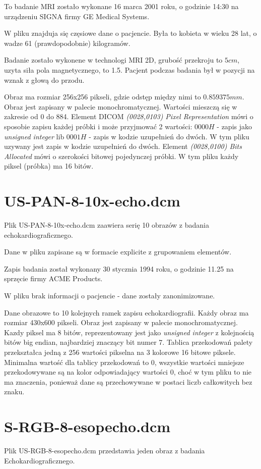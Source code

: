 \documentclass[11pt,a4paper]{article}
\begin{document}
To badanie MRI zostało wykonane 16 marca 2001 roku, o godzinie 14:30 na
urządzeniu SIGNA firmy GE Medical Systems.

W pliku znajduja się częsiowe dane o pacjencie. Była to kobieta w wieku 28 lat,
o wadze 61 (prawdopodobnie) kilogramów.

Badanie zostało wykonene w technologi MRI 2D, grubość przekroju to $5 cm$,
uzyta siła pola magnetycznego, to 1.5. Pacjent podczas badania był w pozycji na
wznak z głową do przodu.

Obraz ma rozmiar 256x256 pikseli, gdzie odstęp między nimi to $0.859375 mm$.
Obraz jest zapisany w palecie monochromatycznej.
Wartości mieszczą się w zakresie od 0 do 884. Element DICOM \emph{(0028,0103) Pixel
Representation} mówi o sposobie zapisu każdej próbki i może przyjmować 2
wartości: $0000H$ - zapis jako \emph{unsigned integer} lib $0001H$ - zapis w
kodzie uzupełnień do dwóch. W tym pliku uzywany jest zapis w kodzie uzupełnień
do dwóch. Element \emph{(0028,0100) Bits Allocated} mówi o szerokości bitowej
pojedynczej próbki. W tym pliku każdy piksel (próbka) ma 16 bitów.


\section{US-PAN-8-10x-echo.dcm}
Plik US-PAN-8-10x-echo.dcm zaawiera serię 10 obrazów z badania
echokardiograficznego.

Dane w pliku zapisane są w formacie explicite z grupowaniem elementów.

Zapis badania został wykonany 30 stycznia 1994 roku, o godzinie 11.25 na
sprzęcie firmy ACME Products.

W pliku brak informacji o pacjencie - dane zostały zanonimizowane.

Dane obrazowe to 10 kolejnych ramek zapisu echokardiografii. Każdy obraz ma
rozmiar 430x600 pikseli. Obraz jest zapisany w palecie monochromatycznej. Kazdy
piksel ma 8 bitów, reprezentowany jest jako \emph{unsigned integer} z
kolejnością bitów big endian, najbardziej znaczący bit numer 7. Tablica
przekodowań palety przekształca jedną z 256 wartości pikselna na 3 kolorowe 16
bitowe piksele. Minimalna wartość dla tablicy przekodowań to $0$, wszystkie
wartości mniejsze przekodowywane są na kolor odpowiadający wartości $0$, choć w
tym pliku to nie ma znaczenia, ponieważ dane są przechowywane w postaci liczb
całkowitych bez znaku.

\section{S-RGB-8-esopecho.dcm}
Plik US-RGB-8-esopecho.dcm przedstawia jeden obraz z badania Echokardiograficznego.
\end{document}
